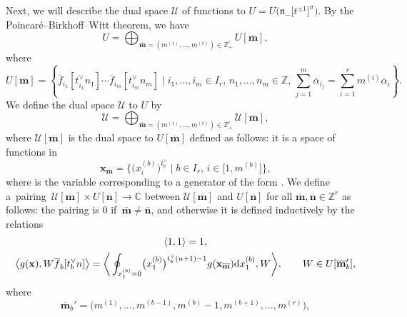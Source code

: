 \documentclass[pdftex]{sigma}
\numberwithin{equation}{section}
\begin{document}
Next, we will describe the dual space $\mathcal{U}$ of functions to $U=U\bigl(\mathfrak{n}_-\bigl[t^{\pm1}\bigr]^{\sigma}\bigr)$. By the Poincar\'e--Birkhoff--Witt theorem, we have
\begin{equation*}
U=\bigoplus_{\overline{\mathbf{m}}=(m^{(1)},\dots,m^{(r)})\in\mathbb{Z}_+^r}U[\overline{\mathbf{m}}],
\end{equation*}
where
\begin{equation*}
U[\overline{\mathbf{m}}]=\left\{\overline{f}_{i_1}[t_{i_1}^{\vee}n_1]\cdots\overline{f}_{i_m}[t_{i_m}^{\vee}n_m] \mid i_1,\dots,i_m\in I_r,\,n_1,\dots,n_m\in\mathbb{Z},\, \sum_{j=1}^m\overline{\alpha}_{i_j}=\sum_{i=1}^rm^{(i)} \overline{\alpha}_i\right\}.
\end{equation*}
We define the dual space $\mathcal{U}$ to $U$ by
\begin{equation*}
\mathcal{U}=\bigoplus_{\overline{\mathbf{m}}=(m^{(1)},\dots,m^{(r)})\in\mathbb{Z}_+^r}\mathcal{U}[\overline{\mathbf{m}}],
\end{equation*}
where $\mathcal{U}[\overline{\mathbf{m}}]$ is the dual space to $U[\overline{\mathbf{m}}]$ defined as follows: it is a space of functions in
\begin{equation*}
\mathbf{x}_{\overline{\mathbf{m}}}
=\bigl\{\bigl(x_i^{(b)}\bigr)^{t_b^{\vee}}\mid b\in I_r,\,i\in \bigl[1,m^{(b)}\bigr]\bigr\},
\end{equation*}
where  is the variable corresponding to a generator of the form . We define a~pairing~${\mathcal{U}[\overline{\mathbf{m}}]\times U[\overline{\mathbf{n}}]\to\mathbb{C}}$ between $\mathcal{U}[\overline{\mathbf{m}}]$ and $U[\overline{\mathbf{n}}]$ for all $\overline{\mathbf{m}},\overline{\mathbf{n}}\in \mathbb{Z}^r$ as follows: the pairing is $0$ if~${\overline{\mathbf{m}}\neq\overline{\mathbf{n}}}$, and otherwise it is defined inductively by the relations
\begin{gather*}
\langle 1,1\rangle =1,\\
\big\langle g(\mathbf{x}),W\overline{f}_b[t_b^{\vee}n]\big\rangle
=\bigg\langle\oint\nolimits_{x_1^{(b)}=0}\bigl(x_1^{(b)}\bigr) ^{t_b^{\vee}(n+1)-1} g(\mathbf{x}_{\overline{\mathbf{m}}}) {\rm d}x_1^{(b)},W\bigg\rangle, \qquad W\in U[\overline{\mathbf{m}}_b'],
\end{gather*}
where
\begin{equation*}
\overline{\mathbf{m}}_b'=\bigl(m^{(1)},\dots,m^{(b-1)}, m^{(b)}-1,m^{(b+1)},\dots,m^{(r)}\bigr),
\end{equation*}
\end{document}
